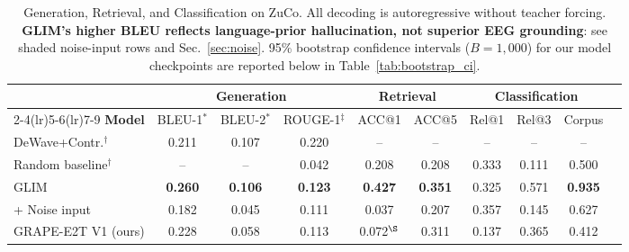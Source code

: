 
\usepackage{booktabs}
\usepackage{multirow}
\usepackage{colortbl}
\usepackage{xcolor}


\begin{table}[!t]
\caption{Generation, Retrieval, and Classification on ZuCo. All decoding is autoregressive without teacher forcing. \textbf{GLIM's higher BLEU reflects language-prior hallucination, not superior EEG grounding}: see shaded noise-input rows and Sec.~\ref{sec:noise}. 95\% bootstrap confidence intervals ($B=1{,}000$) for our model checkpoints are reported below in Table~\ref{tab:bootstrap_ci}.}
\label{tab:main}
\centering
\small
\begin{tabular}{lccccccccc}
\toprule
& \multicolumn{3}{c}{\textbf{Generation}} & \multicolumn{2}{c}{\textbf{Retrieval}}
& \multicolumn{3}{c}{\textbf{Classification}}\\
\cmidrule(lr){2-4}\cmidrule(lr){5-6}\cmidrule(lr){7-9}
\textbf{Model} & BLEU-1$^{\ast}$ & BLEU-2$^{\ast}$ & ROUGE-1$^{\ddagger}$
& ACC@1 & ACC@5 & Rel@1 & Rel@3 & Corpus\\
\midrule
DeWave+Contr.$^{\dagger}$ \cite{duan2023dewave} & 0.211 & 0.107 & 0.220 & -- & -- & -- & -- & --\\
Random baseline$^{\dagger}$ \cite{jo2024areEEG}  & -- & -- & 0.042 & 0.208 & 0.208 & 0.333 & 0.111 & 0.500\\
GLIM \cite{liu2025glim}                          & \textbf{0.260} & \textbf{0.106} & \textbf{0.123} & \textbf{0.427} & \textbf{0.351} & 0.325 & 0.571 & \textbf{0.935}\\
\rowcolor{noiserow}
\quad + Noise input                              & 0.182 & 0.045 & 0.111 & 0.037 & 0.207 & 0.357 & 0.145 & 0.627\\
\midrule
GRAPE-E2T V1 (ours)                              & 0.228 & 0.058 & 0.113 & 0.072$^\S$ & 0.311 & 0.137 & 0.365 & 0.412\\

\end{tabular}
\end{table}
